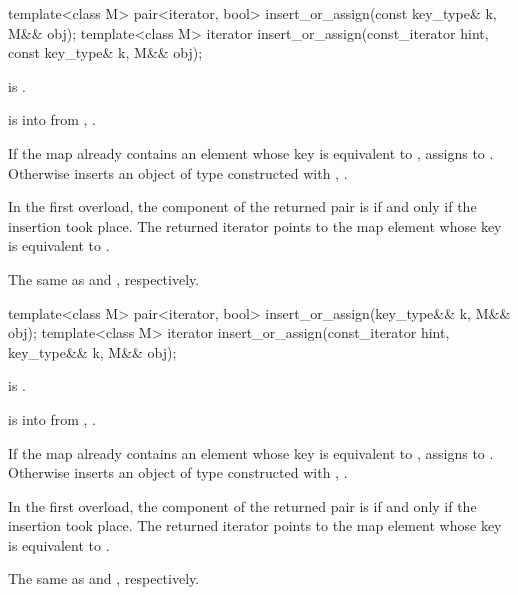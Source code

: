 %
\begin{itemdecl}
template<class M>
  pair<iterator, bool> insert_or_assign(const key_type& k, M&& obj);
template<class M>
  iterator insert_or_assign(const_iterator hint, const key_type& k, M&& obj);
\end{itemdecl}

\begin{itemdescr}
\pnum
\mandates
{} is .

\pnum
\expects
{} is  into 
from , .

\pnum
\effects
If the map already contains an element 
whose key is equivalent to ,
assigns  to .
Otherwise inserts an object of type 
constructed with , .

\pnum
\returns
In the first overload,
the  component of the returned pair is 
if and only if the insertion took place.
The returned iterator points to the map element
whose key is equivalent to .

\pnum
\complexity
The same as  and ,
respectively.
\end{itemdescr}

%
\begin{itemdecl}
template<class M>
  pair<iterator, bool> insert_or_assign(key_type&& k, M&& obj);
template<class M>
  iterator insert_or_assign(const_iterator hint, key_type&& k, M&& obj);
\end{itemdecl}

\begin{itemdescr}
\pnum
\mandates
{} is .

\expects
{} is  into 
from , .

\pnum
\effects
If the map already contains an element 
whose key is equivalent to ,
assigns  to .
Otherwise inserts an object of type 
constructed with , .

\pnum
\returns
In the first overload,
the  component of the returned pair is 
if and only if the insertion took place.
The returned iterator points to the map element
whose key is equivalent to .

\pnum
\complexity
The same as  and ,
respectively.
\end{itemdescr}

